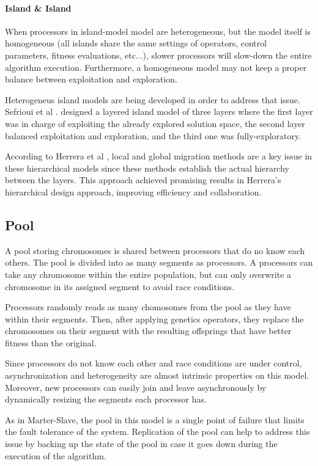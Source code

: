 \paragraph*{Island \& Island} When processors in island-model model are heterogeneous, but the model itself is homogeneous (all islands share the same settings of operators, control parameters, fitness evaluations, etc...), slower processors will slow-down the entire algorithm execution. Furthermore, a homogeneous model may not keep a proper balance between exploitation and exploration.  

Heterogeneus island models are being developed in order to address that issue. Sefrioui et al \cite{112}. designed a layered island model of three layers where the first layer was in charge of exploiting the already explored solution space, the second layer balanced exploitation and exploration, and the third one was fully-exploratory.

According to Herrera et al \cite{57}, local and global migration methods are a key issue in these hierarchical models since these methods establish the actual hierarchy between the layers. This approach achieved promising results in Herrera's hierarchical design approach, improving efficiency and collaboration. 

\subsection{Pool}
A pool storing chromosomes is shared between processors that do no know each others. The pool is divided into as many segments as processors. A processors can take any chromosome within the entire population, but can only overwrite a chromosome in its assigned segment to avoid race conditions.

Processors randomly reads as many chomosomes from the pool as they have within their segments. Then, after applying genetics operators, they replace the chromosomes on their segment with the resulting offsprings that have better fitness than the original. 

Since processors do not know each other and race conditions are under control, asynchronization and heterogeneity are almost intrinsic properties on this model. Moreover, new processors can easily join and leave asynchronously by dynamically resizing the segments each processor has.

As in Marter-Slave, the pool in this model is a single point of failure that limits the fault tolerance of the system. Replication of the pool can help to address this issue by backing up the state of the pool in case it goes down during the execution of the algorithm. 

